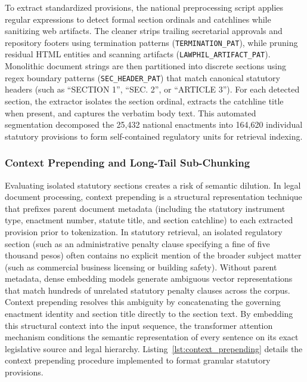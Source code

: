         To extract standardized provisions, the national preprocessing script applies regular expressions to detect formal section ordinals and catchlines while sanitizing web artifacts. The cleaner strips trailing secretarial approvals and repository footers using termination patterns (\texttt{TERMINATION\_PAT}), while pruning residual HTML entities and scanning artifacts (\texttt{LAWPHIL\_ARTIFACT\_PAT}). Monolithic document strings are then partitioned into discrete sections using regex boundary patterns (\texttt{SEC\_HEADER\_PAT}) that match canonical statutory headers (such as ``SECTION 1'', ``SEC. 2'', or ``ARTICLE 3''). For each detected section, the extractor isolates the section ordinal, extracts the catchline title when present, and captures the verbatim body text. This automated segmentation decomposed the 25,432 national enactments into 164,620 individual statutory provisions to form self-contained regulatory units for retrieval indexing.

        \subsubsection{Context Prepending and Long-Tail Sub-Chunking}
        \label{sec:national_context_chunking}
        Evaluating isolated statutory sections creates a risk of semantic dilution. In legal document processing, context prepending is a structural representation technique that prefixes parent document metadata (including the statutory instrument type, enactment number, statute title, and section catchline) to each extracted provision prior to tokenization. In statutory retrieval, an isolated regulatory section (such as an administrative penalty clause specifying a fine of five thousand pesos) often contains no explicit mention of the broader subject matter (such as commercial business licensing or building safety). Without parent metadata, dense embedding models generate ambiguous vector representations that match hundreds of unrelated statutory penalty clauses across the corpus. Context prepending resolves this ambiguity by concatenating the governing enactment identity and section title directly to the section text. By embedding this structural context into the input sequence, the transformer attention mechanism conditions the semantic representation of every sentence on its exact legislative source and legal hierarchy. Listing~\ref{lst:context_prepending} details the context prepending procedure implemented to format granular statutory provisions.


